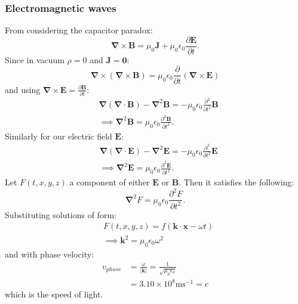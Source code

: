 \documentclass{article}
\newcommand{\vc}[1]{\boldsymbol{#1}}
\begin{document}
\begin{multicols*}{3}
\subsubsection*{Electromagnetic waves}
From considering the capacitor paradox:
$$\vc{\nabla}\times\vc{B}=\mu_0\vc{J}
+\mu_0\epsilon_0\frac{\partial\vc{E}}{\partial t}.$$
Since in vacuum $\rho=0$ and $\vc{J}=\vc{0}$:
$$\vc{\nabla}\times(\vc{\nabla}\times\vc{B})
=\mu_0\epsilon_0\frac{\partial}
{\partial t}(\vc{\nabla}\times\vc{E})$$
and using $\displaystyle\vc{\nabla}\times\vc{E}
=\frac{\partial\vc{B}}{\partial t}$:
\begin{align*}
    &\vc{\nabla}(\vc{\nabla}\cdot\vc{B})
    -\vc{\nabla}^2\vc{B}=-\mu_0\epsilon_0\frac{\partial^2}
    {\partial t^2}\vc{B} \\
    &\implies\vc{\nabla}^2\vc{B}=\mu_0\epsilon_0
    \frac{\partial^2\vc{B}}{\partial t^2}.
\end{align*}
Similarly for our electric field $\vc{E}$:
\begin{align*}
    &\vc{\nabla}(\vc{\nabla}\cdot\vc{E})
    -\vc{\nabla}^2\vc{E}=-\mu_0\epsilon_0\frac{\partial^2}
    {\partial t^2}\vc{E} \\
    &\implies\vc{\nabla}^2\vc{E}=\mu_0\epsilon_0
    \frac{\partial^2\vc{E}}{\partial t^2}.
\end{align*}
Let $F(t,x,y,z)$ a component of either $\vc{E}$ or $\vc{B}$.
Then it satisfies the following:
$$\vc{\nabla}^2F=\mu_0\epsilon_0\frac{\partial^2F}{\partial t^2}.$$
Substituting solutions of form:
\begin{align*}
    &F(t,x,y,z)=f(\vc{k}\cdot\vc{x}-\omega t) \\
    &\implies\vc{k}^2=\mu_0\epsilon_0\omega^2
\end{align*}
and with phase velocity:
\begin{align*}
    v_{phase}&=\frac{\omega}{|\vc{k}|}
    =\frac{1}{\sqrt{\mu_0\epsilon_0}} \\
    &=3.10\times10^8\text{ms}^{-1}=c
\end{align*}
which is the speed of light.

\end{multicols*}
\end{document}

